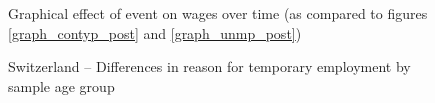 \begin{figure}
    \caption{Graphical effect of event on wages over time (as compared to figures \ref{graph_contyp_post} and  \ref{graph_unmp_post})}
    \label{graph_post_age_16_64}
\end{figure}

\begin{figure}
    \caption{Switzerland -- Differences in reason for temporary employment by sample age group}
    \label{graph_ch_compare_sample_age}
\end{figure}

